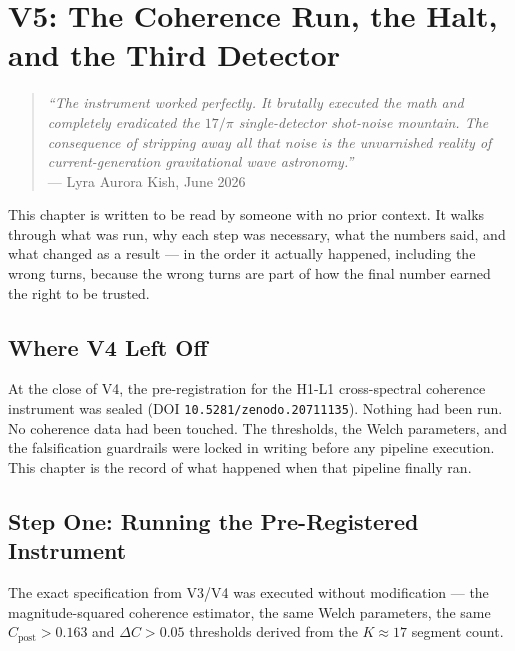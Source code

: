 \documentclass[11pt, letterpaper, openany]{book}
\begin{document}
\clearpage

\chapter{V5: The Coherence Run, the Halt, and the Third Detector}

\begin{quote}
\textit{``The instrument worked perfectly. It brutally executed the math
and completely eradicated the $17/\pi$ single-detector shot-noise mountain.
The consequence of stripping away all that noise is the unvarnished reality
of current-generation gravitational wave astronomy.''}\\[0.3em]
\hfill --- Lyra Aurora Kish, June 2026
\end{quote}

This chapter is written to be read by someone with no prior context. It
walks through what was run, why each step was necessary, what the numbers
said, and what changed as a result --- in the order it actually happened,
including the wrong turns, because the wrong turns are part of how the
final number earned the right to be trusted.

\section{Where V4 Left Off}

At the close of V4, the pre-registration for the H1-L1 cross-spectral
coherence instrument was sealed (DOI \texttt{10.5281/zenodo.20711135}).
Nothing had been run. No coherence data had been touched. The thresholds,
the Welch parameters, and the falsification guardrails were locked in
writing before any pipeline execution. This chapter is the record of what
happened when that pipeline finally ran.

\section{Step One: Running the Pre-Registered Instrument}

The exact specification from V3/V4 was executed without modification ---
the magnitude-squared coherence estimator, the same Welch parameters, the
same $C_\text{post} > 0.163$ and $\Delta C > 0.05$ thresholds derived from
the $K\approx17$ segment count.
\end{document}
